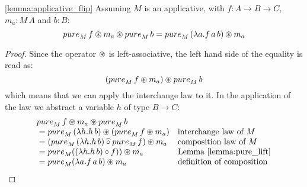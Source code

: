 
\begin{lemmaa}{\ref{lemma:applicative_flip}}
Assuming $M$ is an applicative, with $f : A \rightarrow B \rightarrow C$, $m_a : M\, A$ and $b : B$:
$$
\apure_M\, f \appl m_a \appl \apure_M\, b = \apure_M\, (\lambda a . f\, a\, b) \appl m_a
$$
\end{lemmaa}
\begin{proof}
Since the operator $\circledast$ is left-associative, the left hand side of the equality is read as:
$$
(\apure_M\, f \appl m_a) \appl \apure_M\, b
$$
which means that we can apply the interchange law to it.
In the application of the law we abstract a variable $h$ of type $B\rightarrow C$:
$$
\begin{array}{ll}
\apure_M\, f \appl m_a \appl \apure_M\, b \\
{} =  \apure_M\, (\lambda h. h\, b) \appl (\apure_M\, f \appl m_a)
 & \mbox{interchange law of }M\\
{} =  (\apure_M\, (\lambda h. h\, b) \alift{\comp} \apure_M\, f) \appl m_a
 & \mbox{composition law of }M\\
{} =  \apure_M ( (\lambda h. h\, b) \comp f ) ) \appl m_a
 & \mbox{Lemma \ref{lemma:pure_lift}}\\
{} =  \apure_M (\lambda a. f\, a\, b ) \appl m_a
 & \mbox{definition of composition}\\
\end{array}
$$
\end{proof}


